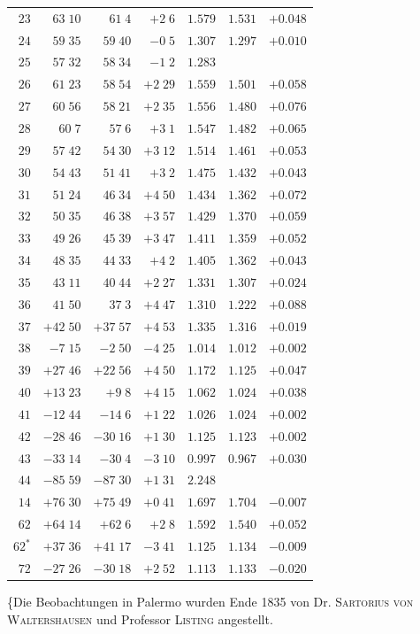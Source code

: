\begin{center}
\begin{tabular}{r||r|r|r||r|r|r}
$23$&$63\;10$&$61\;4$&$+2\;6$&$1.579$&$1.531$&$+0.048$\\
$24$&$59\;35$&$59\;40$&$-0\;5$&$1.307$&$1.297$&$+0.010$\\
$25$&$57\;32$&$58\;34$&$-1\;2$&$1.283$&&\\
$26$&$61\;23$&$58\;54$&$+2\;29$&$1.559$&$1.501$&$+0.058$\\
$27$&$60\;56$&$58\;21$&$+2\;35$&$1.556$&$1.480$&$+0.076$\\
$28$&$60\;7$&$57\;6$&$+3\;1$&$1.547$&$1.482$&$+0.065$\\
$29$&$57\;42$&$54\;30$&$+3\;12$&$1.514$&$1.461$&$+0.053$\\
$30$&$54\;43$&$51\;41$&$+3\;2$&$1.475$&$1.432$&$+0.043$\\[2pt]
$31$&$51\;24$&$46\;34$&$+4\;50$&$1.434$&$1.362$&$+0.072$\\
$32$&$50\;35$&$46\;38$&$+3\;57$&$1.429$&$1.370$&$+0.059$\\
$33$&$49\;26$&$45\;39$&$+3\;47$&$1.411$&$1.359$&$+0.052$\\
$34$&$48\;35$&$44\;33$&$+4\;2$&$1.405$&$1.362$&$+0.043$\\
$35$&$43\;11$&$40\;44$&$+2\;27$&$1.331$&$1.307$&$+0.024$\\
$36$&$41\;50$&$37\;3$&$+4\;47$&$1.310$&$1.222$&$+0.088$\\
$37$&$+42\;50$&$+37\;57$&$+4\;53$&$1.335$&$1.316$&$+0.019$\\
$38$&$-7\;15$&$-2\;50$&$-4\;25$&$1.014$&$1.012$&$+0.002$\\
$39$&$+27\;46$&$+22\;56$&$+4\;50$&$1.172$&$1.125$&$+0.047$\\
$40$&$+13\;23$&$+9\;8$&$+4\;15$&$1.062$&$1.024$&$+0.038$\\[2pt]
$41$&$-12\;44$&$-14\;6$&$+1\;22$&$1.026$&$1.024$&$+0.002$\\
$42$&$-28\;46$&$-30\;16$&$+1\;30$&$1.125$&$1.123$&$+0.002$\\
$43$&$-33\;14$&$-30\;4$&$-3\;10$&$0.997$&$0.967$&$+0.030$\\
$44$&$-85\;59$&$-87\;30$&$+1\;31$&$2.248$&&\\
$14$&$+76\;30$&$+75\;49$&$+0\;41$&$1.697$&$1.704$&$-0.007$\\
$62$&$+64\;14$&$+62\;6$&$+2\;8$&$1.592$&$1.540$&$+0.052$\\
$62^{*}$&$+37\;36$&$+41\;17$&$-3\;41$&$1.125$&$1.134$&$-0.009$\\
$72$&$-27\;26$&$-30\;18$&$+2\;52$&$1.113$&$1.133$&$-0.020$\\
\hline
\end{tabular}
\end{center}
\endgroup
\clearpage
{}
\{Die Beobachtungen in Palermo wurden Ende 1835 von Dr. \textsc{Sartorius von Waltershausen} und Professor \textsc{Listing} angestellt.

